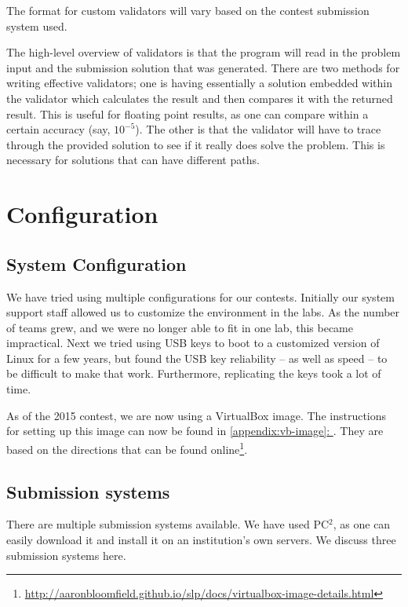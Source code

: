 \documentclass[11pt,twoside,letterpaper]{book}
\newcommand{\footurl}[1]{\footnote{\scriptsize\url{#1}}}
\newcommand*{\fullref}[1]{\hyperref[{#1}]{\autoref*{#1}: \nameref*{#1}}}
\begin{document}
The format for custom validators will vary based on the contest
submission system used.

The high-level overview of validators is that the program will read in
the problem input and the submission solution that was generated.
There are two methods for writing effective validators; one is having
essentially a solution embedded within the validator which calculates
the result and then compares it with the returned result.  This is
useful for floating point results, as one can compare within a certain
accuracy (say, $10^{-5}$).  The other is that the validator will have
to trace through the provided solution to see if it really does solve
the problem.  This is necessary for solutions that can have different
paths.


\cleardoublepage
\chapter{Configuration}

\section{System Configuration}

We have tried using multiple configurations for our contests.
Initially our system support staff allowed us to customize the
environment in the labs.  As the number of teams grew, and we were no
longer able to fit in one lab, this became impractical.  Next we tried
using USB keys to boot to a customized version of Linux for a few
years, but found the USB key reliability -- as well as speed -- to be
difficult to make that work.  Furthermore, replicating the keys took a
lot of time.

As of the 2015 contest, we are now using a VirtualBox image.  The
instructions for setting up this image can now be found in
\fullref{appendix:vb-image}.  They are based on the directions that
can be found
online\footurl{http://aaronbloomfield.github.io/slp/docs/virtualbox-image-details.html}.


\section{Submission systems}

There are multiple submission systems available.  We have used PC$^2$,
as one can easily download it and install it on an institution's own
servers.  We discuss three submission systems here.
\end{document}

